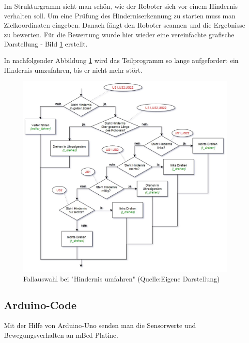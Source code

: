 Im Strukturgramm sieht man schön, wie der Roboter sich vor einem Hindernis verhalten soll. Um eine Prüfung des Hinderniserkennung zu starten muss man Zielkoordinaten eingeben. Danach fängt den Roboter scannen und die Ergebnisse zu bewerten. Für die Bewertung wurde hier wieder eine vereinfachte grafische Darstellung - Bild \ref{baum2} erstellt.

In nachfolgender Abbildung \ref{baum2} wird das Teilprogramm so lange aufgefordert ein Hindernis umzufahren, bis er nicht mehr stört.

\begin{figure}[!h]  %
	\centering\includegraphics[width=0.99\textwidth]{images/Entsch-baum2.jpg}
	\caption{ Fallauswahl bei "Hindernis umfahren" (Quelle:Eigene Darstellung)}
	\label{baum2} %
\end{figure}
\pagebreak

\subsection{Arduino-Code}

Mit der Hilfe von Arduino-Uno senden man die Sensorwerte und Bewegungsverhalten an mBed-Platine. 

